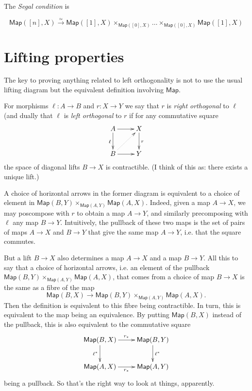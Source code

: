 The {\it Segal condition} is

$$
\mathsf{Map}([n],X) \xrightarrow{\simeq}
\mathsf{Map}([1],X) \times_{\mathsf{Map}([0],X)}\ldots
\times_{\mathsf{Map}([0],X)}\mathsf{Map}([1],X)
$$

\section{Lifting properties}
\label{section-lifting-properties}

The key to proving anything related
to left orthogonality is not to use
the usual lifting diagram but
the equivalent definition involving $\mathsf{Map}$.

\begin{definition}
\label{definition-orthogonal}
For morphisms $\ell:A \to B$ and $r:X \to Y$ 
we say that $r$ is {\it right orthogonal} 
to $\ell$ (and dually that $\ell$ is 
{\it left orthogonal} to  $r$ if
for any commutative square
$$
\xymatrix{
A\ar[r]\ar[d]_{\ell}&X\ar[d]^{r}\\
B\ar@{.>}[ur]\ar[r]&Y
}
$$
the space of diagonal lifts $B \to X$ is contractible.
(I think of this as: there exists a unique lift.)
\end{definition}

\noindent
A choice of horizontal arrows in the former
diagram is equivalent to a choice of element in
$\mathsf{Map}(B,Y)\times_{\mathsf{Map}(A,Y)}\mathsf{Map}(A,X)$.
Indeed, given a map $A\to X$,
we may poscompose with $r$ to obtain
a map $A \to Y$, and similarly precomposing with 
$\ell$ any map $B \to Y$.
Intuitively, the pullback
of these two maps is the set of pairs
of maps $A \to X$ and $B \to Y$
that give the same map  $A \to Y$,
i.e. that the square commutes.

But a lift $B \to X$ also determines
a map $A \to X$ and 
a map $B \to Y$.
All this to say that 
a choice of horizontal arrows,
i.e. an element of the pullback
$\mathsf{Map}(B,Y) \times_{\mathsf{Map}(A,Y)}\mathsf{Map}(A,X)$,
that comes from a choice of map
$B \to X$ is the same as 
a fibre of the map
$$
\mathsf{Map}(B,X) \to 
\mathsf{Map}(B,Y) \times_{\mathsf{Map}(A,Y)}\mathsf{Map}(A,X).
$$
Then the definition is equivalent
to this fibre being contractible.
In turn, this is equivalent to the
map being an equivalence.
By putting $\mathsf{Map}(B,X)$ instead
of the pullback, this is also equivalent
to the commutative square
$$
\xymatrix{
\mathsf{Map}(B,X)\ar[r]^{r_*}\ar[d]_{\ell^*}&\mathsf{Map}(B,Y)\ar[d]^{\ell^*}\\
\mathsf{Map}(A,X)\ar[r]_{r_*}&\mathsf{Map}(A,Y)
}
$$
being a pullback. So that's the
right way to look at things, apparently.

